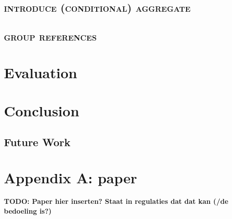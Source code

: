 \documentclass[12pt,a4paper,onecolumn,oneside,parskip]{memoir}
\newcommand{\todo}[1]{\textbf{TODO: #1}}
\newcommand{\rf}[1]{\textsc{\lowercase{#1}}}
\begin{document}
\section{\rf{Introduce (Conditional) Aggregate}}

\section{\rf{Group References}}

\chapter{Evaluation}


\chapter{Conclusion}

\section{Future Work}



\chapter{Appendix A: paper}

\todo{Paper hier inserten? Staat in regulaties dat dat kan (/de bedoeling is?)}



\end{document}
